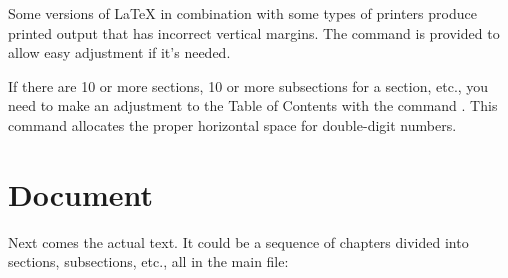 Some versions of LaTeX in combination with some types of printers
produce printed output that has incorrect vertical margins.
The command  is provided to allow easy adjustment
if it's needed.

If there are 10 or more sections, 10 or more subsections for a section,
etc., you need to make an adjustment to the Table of Contents with the
command .
%
This command allocates the proper horizontal space for double-digit
numbers.


\section{Document}
%

Next comes the actual text. It could be a sequence of chapters divided
into sections, subsections, etc., all in the main file:
